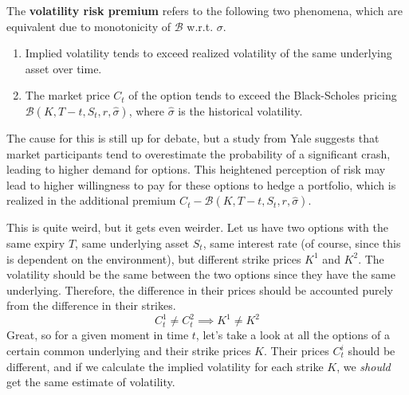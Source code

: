 \documentclass{article}
\begin{document}
    \begin{theorem}
      The \textbf{volatility risk premium} refers to the following two phenomena, which are equivalent due to monotonicity of $\mathcal{B}$ w.r.t. $\sigma$. 
      \begin{enumerate}
        \item Implied volatility tends to exceed realized volatility of the same underlying asset over time. 
        \item The market price $C_t$ of the option tends to exceed the Black-Scholes pricing $\mathcal{B}(K, T - t, S_t, r, \hat{\sigma})$, where $\hat{\sigma}$ is the historical volatility. 
      \end{enumerate}
    \end{theorem}

    The cause for this is still up for debate, but a study from Yale suggests that market participants tend to overestimate the probability of a significant crash, leading to higher demand for options. This heightened perception of risk may lead to higher willingness to pay for these options to hedge a portfolio, which is realized in the additional premium $C_t - \mathcal{B}(K, T - t, S_t, r, \hat{\sigma})$. 

    This is quite weird, but it gets even weirder. Let us have two options with the same expiry $T$, same underlying asset $S_t$, same interest rate (of course, since this is dependent on the environment), but different strike prices $K^1$ and $K^2$. The volatility should be the same between the two options since they have the same underlying. Therefore, the difference in their prices should be accounted purely from the difference in their strikes. 
    \begin{equation}
      C_t^1 \neq C_t^2 \implies K^1 \neq K^2
    \end{equation}
    Great, so for a given moment in time $t$, let's take a look at all the options of a certain common underlying and their strike prices $K$. Their prices $C_t^i$ should be different, and if we calculate the implied volatility for each strike $K$, we \textit{should} get the same estimate of volatility. 
\end{document}
